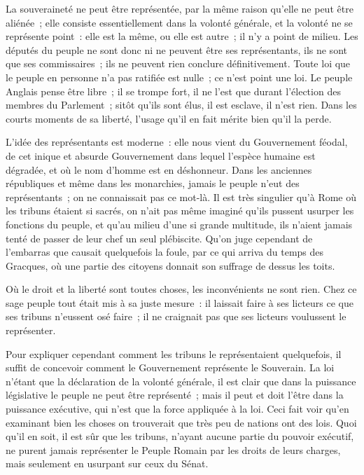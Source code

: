 \documentclass[french,twoside]{book} %
\begin{document}
La souveraineté ne peut être représentée, par la même raison qu’elle ne peut être aliénée ; elle consiste essentiellement dans la volonté générale, et la volonté ne se représente point : elle est la même, ou elle est autre ; il n’y a point de milieu. Les députés du peuple ne sont donc ni ne peuvent être ses représentants, ils ne sont que ses commissaires ; ils ne peuvent rien conclure définitivement. Toute loi que le peuple en personne n’a pas ratifiée est nulle ; ce n’est point une loi. Le peuple Anglais pense être libre ; il se trompe fort, il ne l’est que durant l’élection des membres du Parlement ; sitôt qu’ils sont élus, il est esclave, il n’est rien. Dans les courts moments de sa liberté, l’usage qu’il en fait mérite bien qu’il la perde.\par
L’idée des représentants est moderne : elle nous vient du Gouvernement féodal, de cet inique et absurde Gouvernement dans lequel l’espèce humaine est dégradée, et où le nom d’homme est en déshonneur. Dans les anciennes républiques et même dans les monarchies, jamais le peuple n’eut des représentants ; on ne connaissait pas ce mot-là. Il est très singulier qu’à Rome où les tribuns étaient si sacrés, on n’ait pas même imaginé qu’ils pussent usurper les fonctions du peuple, et qu’au milieu d’une si grande multitude, ils n’aient jamais tenté de passer de leur chef un seul plébiscite. Qu’on juge cependant de l’embarras que causait quelquefois la foule, par ce qui arriva du temps des Gracques, où une partie des citoyens donnait son suffrage de dessus les toits.\par
Où le droit et la liberté sont toutes choses, les inconvénients ne sont rien. Chez ce sage peuple tout était mis à sa juste mesure : il laissait faire à ses licteurs ce que ses tribuns n’eussent osé faire ; il ne craignait pas que ses licteurs voulussent le représenter.\par
Pour expliquer cependant comment les tribuns le représentaient quelquefois, il suffit de concevoir comment le Gouvernement représente le Souverain. La loi n’étant que la déclaration de la volonté générale, il est clair que dans la puissance législative le peuple ne peut être représenté ; mais il peut et doit l’être dans la puissance exécutive, qui n’est que la force appliquée à la loi. Ceci fait voir qu’en examinant bien les choses on trouverait que très peu de nations ont des lois. Quoi qu’il en soit, il est sûr que les tribuns, n’ayant aucune partie du pouvoir exécutif, ne purent jamais représenter le Peuple Romain par les droits de leurs charges, mais seulement en usurpant sur ceux du Sénat.\par
\end{document}
